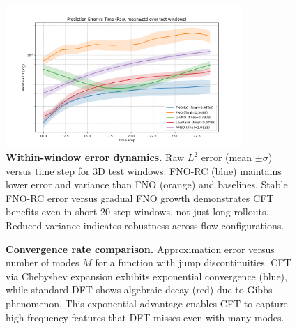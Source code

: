 \documentclass[11pt]{article}
\begin{document}
\begin{figure}[t]
\centering
\includegraphics[width=0.8\textwidth]{../实验图/error_vs_time_raw_mean.png}
\caption{\textbf{Within-window error dynamics.} Raw $L^2$ error (mean $\pm \sigma$) versus time step for 3D test windows. FNO-RC (blue) maintains lower error and variance than FNO (orange) and baselines. Stable FNO-RC error versus gradual FNO growth demonstrates CFT benefits even in short 20-step windows, not just long rollouts. Reduced variance indicates robustness across flow configurations.}
\label{fig:error_time}
\end{figure}

\begin{figure}[t]
\centering
{}
\caption{\textbf{Convergence rate comparison.} Approximation error versus number of modes $M$ for a function with jump discontinuities. CFT via Chebyshev expansion exhibits exponential convergence (blue), while standard DFT shows algebraic decay (red) due to Gibbs phenomenon. This exponential advantage enables CFT to capture high-frequency features that DFT misses even with many modes.}
\label{fig:convergence}
\end{figure}
\end{document}
